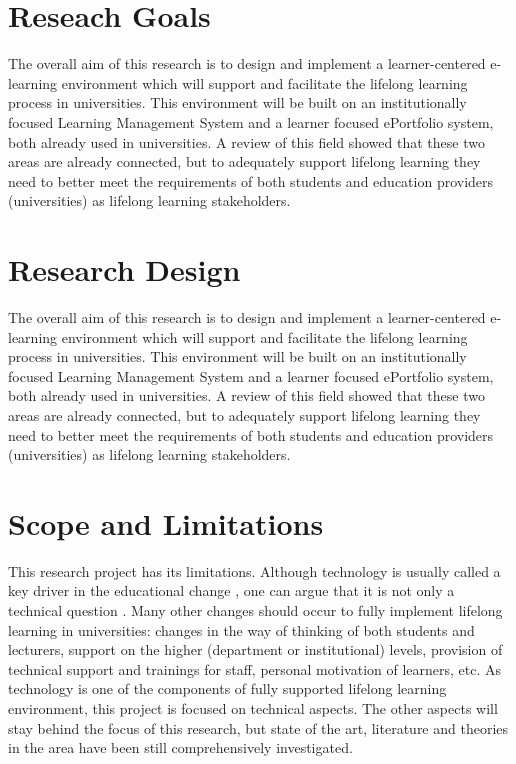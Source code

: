 


\section{Reseach Goals}

The overall aim of this research is to design and implement a learner-centered e-learning
environment which will support and facilitate the lifelong learning process in universities.
This environment will be built on an institutionally focused Learning Management
System and a learner focused ePortfolio system, both already used in universities. A
review of this field showed that these two areas are already connected, but to adequately
support lifelong learning they need to better meet the requirements of both students and
education providers (universities) as lifelong learning stakeholders.

\section{Research Design}

The overall aim of this research is to design and implement a learner-centered e-learning
environment which will support and facilitate the lifelong learning process in universities.
This environment will be built on an institutionally focused Learning Management
System and a learner focused ePortfolio system, both already used in universities. A
review of this field showed that these two areas are already connected, but to adequately
support lifelong learning they need to better meet the requirements of both students and
education providers (universities) as lifelong learning stakeholders.

\section{Scope and Limitations}

This research project has its limitations. Although technology is usually called
a key driver in the educational change \citep{Attwell2007}, one can argue that
it is not only a technical question \citep{Schaffert2008}. Many other changes
should occur to fully implement lifelong learning in universities: changes in
the way of thinking of both students and lecturers, support on the higher
(department or institutional) levels, provision of technical support and
trainings for staff, personal motivation of learners, etc. As technology is one
of the components of fully supported lifelong learning environment, this project
is focused on technical aspects. The other aspects will stay behind the focus of
this research, but state of the art, literature and theories in the area have
been still comprehensively investigated.

